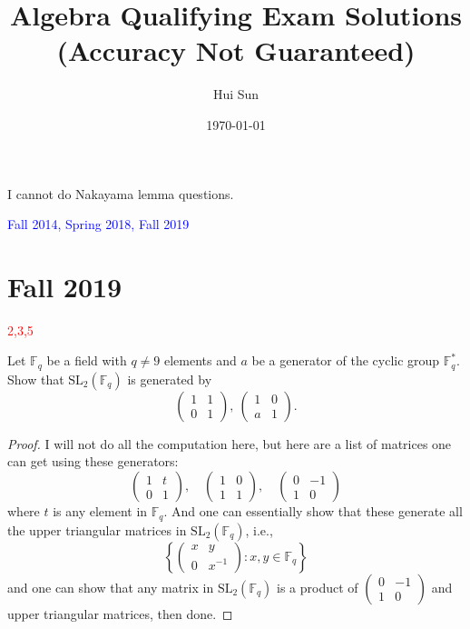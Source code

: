 \documentclass[openany]{book}
\title{Algebra Qualifying Exam Solutions
\\ 
\vspace{0.4cm}
\Large (Accuracy Not Guaranteed)}
\date{\today}
\author{Hui Sun}
\newcommand{\F}{\mathbb{F}}
\begin{document}
\maketitle

\tableofcontents
\newpage


\begin{warn}
    I cannot do Nakayama lemma questions.
\end{warn}


\textcolor{blue}{Fall 2014, Spring 2018, Fall 2019}


\chapter{Fall 2019}

\textcolor{red}{2,3,5}

\begin{prob}
    Let \(\mathbb{F}_{q}\) be a field with \(q\neq 9\) elements and \(a\) be a generator of the cyclic group \(\mathbb{F}^{*}_{q}\). Show that \(\mathrm{SL}_{2}(\mathbb{F}_{q})\) is generated by
    \[\left(\begin{array}{cc}1&1\\0&1\end{array}\right),\ \left(\begin{array}{cc}1&0\\a&1\end{array}\right).\]
\end{prob}
\begin{proof}
    I will not do all the computation here, but here are a list of matrices one can get using these generators:
    \begin{equation*}
        \begin{pmatrix}
            1&t\\
            0&1
        \end{pmatrix}, \quad \begin{pmatrix}
            1&0\\
            1&1
        \end{pmatrix},\quad \begin{pmatrix}
            0&-1\\
            1&0
        \end{pmatrix}
    \end{equation*}
    where $t$ is any element in $\F_q$. And one can essentially show that these generate all the upper triangular matrices in $\text{SL}_2(\F_q)$, i.e.,
    \begin{equation*}
        \left\{\begin{pmatrix}
            x&y\\
            0&x^{-1}
        \end{pmatrix}: x,y\in\F_q\right\}
    \end{equation*}
    and one can show that any matrix in $\text{SL}_2(\F_q)$ is a product of $\begin{pmatrix}
        0&-1\\
        1&0
        \end{pmatrix} $ and upper triangular matrices, then done.
\end{proof}
\end{document}
